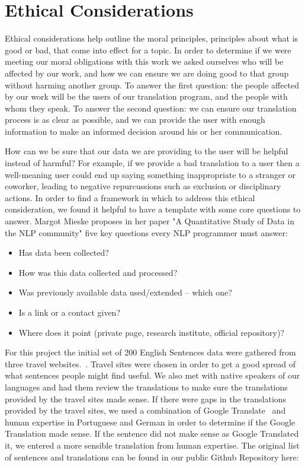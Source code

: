 \documentclass[runningheads]{llncs}
\begin{document}
	\section{Ethical Considerations}
	Ethical considerations help outline the moral principles, principles about what is good or bad, that come into effect for a topic. In order to determine if we were meeting our moral obligations with this work we asked ourselves who will be affected by our work, and how we can ensure we are doing good to that group without harming another group. To answer the first question: the people affected by our work will be the users of our translation program, and the people with whom they speak. To answer the second question: we can ensure our translation process is as clear as possible, and we can provide the user with enough information to make an informed decision around his or her communication. 

	How can we be sure that our data we are providing to the user will be helpful instead of harmful? For example, if we provide a bad translation to a user then a well-meaning user could end up saying something inappropriate to a stranger or coworker, leading to negative repurcussions such as exclusion or disciplinary actions. In order to find a framework in which to address this ethical consideration, we found it helpful to have a template with some core questions to answer. Margot Mieske proposes in her paper "A Quantitative Study of Data in the NLP community" five key questions every NLP programmer must answer: ~\cite{ref_url8}


\begin{itemize}
	\item Has data been collected? 
	\item How was this data collected and processed? 
 	\item Was previously available data used/extended – which one? 
	\item Is a link or a contact given? 
	\item Where does it point (private page, research institute, official repository)?
\end{itemize}

For this project the initial set of 200 English Sentences data were gathered from three travel websites.~\cite{ref_url11,ref_url12,ref_url13}. Travel sites were chosen in order to get a good spread of what sentences people might find useful. We also met with native speakers of our languages and had them review the translations to make sure the translations provided by the travel sites made sense. If there were gaps in the translations provided by the travel sites, we used a combination of Google Translate~\cite{ref_url14} and human expertise in Portuguese and German in order to determine if the Google Translation made sense. If the sentence did not make sense as Google Translated it, we entered a more sensible translation from human expertise. The original list of sentences and translations can be found in our public Github Repository here:
\end{document}
